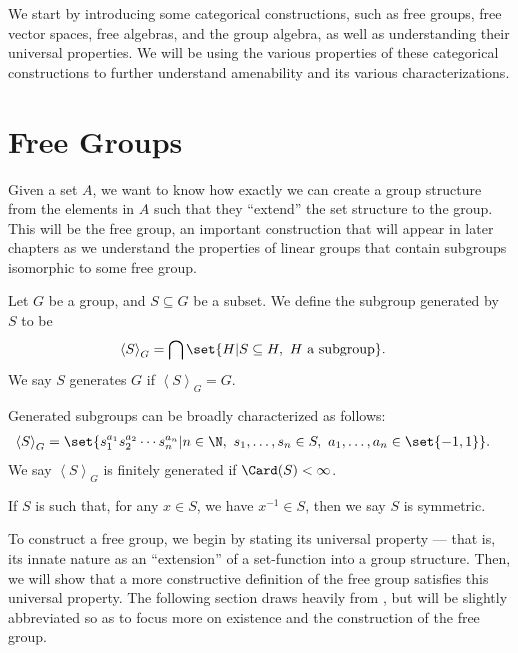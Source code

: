 We start by introducing some categorical constructions, such as free groups, free vector spaces, free algebras, and the group algebra, as well as understanding their universal properties. We will be using the various properties of these categorical constructions to further understand amenability and its various characterizations.
\section{Free Groups}%
Given a set $A$, we want to know how exactly we can create a group structure from the elements in $A$ such that they ``extend'' the set structure to the group. This will be the free group, an important construction that will appear in later chapters as we understand the properties of linear groups that contain subgroups isomorphic to some free group. 
\begin{definition}\label{def:generating_sets}
  Let $G$ be a group, and $S\subseteq G$ be a subset. We define the subgroup {generated by} $S$ to be
  \begin{align*}
    \left\langle S \right\rangle_{G} &= \bigcap \set{H | S\subseteq H,~H\text{ a subgroup}}.
  \end{align*}
  We say $S$ generates $G$ if $\left\langle S \right\rangle_{G} = G$.\newline

  Generated subgroups can be broadly characterized as follows:
  \begin{align*}
    \left\langle S \right\rangle_{G} &= \set{s_1^{a_1}s_2^{a_2}\cdots s_n^{a_n} | n\in\N,~s_1,\dots,s_n\in S,~a_1,\dots,a_n\in \set{-1,1}}.
  \end{align*}
  We say $\left\langle S \right\rangle_{G}$ is finitely generated if $\Card(S) < \infty$.\newline

  If $S$ is such that, for any $x\in S$, we have $x^{-1}\in S$, then we say $S$ is symmetric.
\end{definition}
To construct a free group, we begin by stating its universal property --- that is, its innate nature as an ``extension'' of a set-function into a group structure. Then, we will show that a more constructive definition of the free group satisfies this universal property. The following section draws heavily from \cite{loh_geometric_group_theory}, but will be slightly abbreviated so as to focus more on existence and the construction of the free group.
